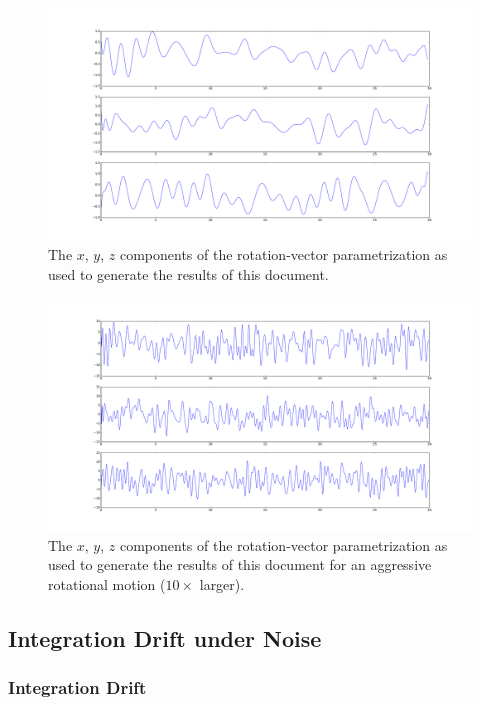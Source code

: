 \documentclass[10pt,a4paper]{article}
\numberwithin{equation}{section}
\begin{document}
\begin{figure}
\includegraphics[width=14cm]{figures/sample_rotation_vector_curve.pdf}
\caption{The $x$, $y$, $z$ components of the rotation-vector parametrization as used to generate the results of this document.}
\label{fig:sample_rotation_curve}
\end{figure}	

\begin{figure}
\includegraphics[width=14cm]{figures/sample_rotation_vector_curve_aggressive.pdf}
\caption{The $x$, $y$, $z$ components of the rotation-vector parametrization as used to generate the results of this document for an aggressive rotational motion ($10 \times$ larger).}
\label{fig:sample_rotation_curve_aggressive}
\end{figure}	

\subsection{Integration Drift under Noise}

\subsubsection{Integration Drift}
\end{document}

